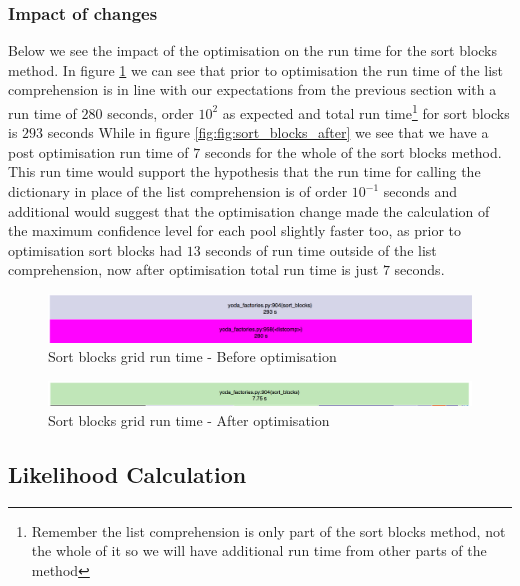 \subsubsection{Impact of changes}

Below we see the impact of the optimisation on the run time for the sort blocks method. In figure \ref{fig:sort_blocks_before} we can see that prior to optimisation the run time of the list comprehension is in line with our expectations from the previous section with a run time of $280$ seconds, order $10^2$ as expected and total run time\footnote{Remember the list comprehension is only part of the sort blocks method, not the whole of it so we will have additional run time from other parts of the method} for sort blocks is $293$ seconds While in figure \ref{fig:fig:sort_blocks_after} we see that we have a post optimisation run time of $7$ seconds for the whole of the sort blocks method. This run time would support the hypothesis that the run time for calling the dictionary in place of the list comprehension is of order $10^{-1}$ seconds and additional would suggest that the optimisation change made the calculation of the maximum confidence level for each pool slightly faster too, as prior to optimisation sort blocks had $13$ seconds of run time outside of the list comprehension, now after optimisation total run time is just $7$ seconds. 

\begin{figure}[H]
\centering
\includegraphics[scale=0.3]{plots/sort_blocks_before.png}
\caption{Sort blocks grid run time - Before optimisation}
\label{fig:sort_blocks_before}
\end{figure}



\begin{figure}[H]
\centering
\includegraphics[scale=0.3]{plots/sort_blocks_after.png}
\caption{Sort blocks grid run time - After optimisation}
\label{fig:sort_blocks_after}
\end{figure}



\subsection{Likelihood Calculation}\label{sec:likelihood}
